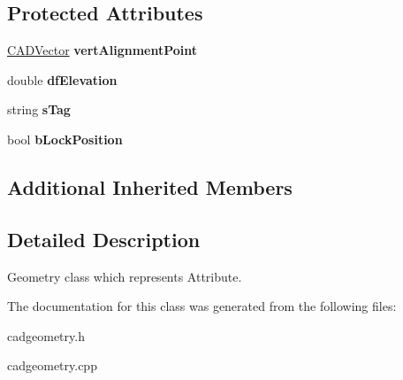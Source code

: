 \subsection*{Protected Attributes}
\begin{DoxyCompactItemize}
\item 
\hyperlink{class_c_a_d_vector}{C\+A\+D\+Vector} {\bfseries vert\+Alignment\+Point}\hypertarget{class_c_a_d_attrib_aead893b2d8dcb83afd25b379a2d18185}{}\label{class_c_a_d_attrib_aead893b2d8dcb83afd25b379a2d18185}

\item 
double {\bfseries df\+Elevation}\hypertarget{class_c_a_d_attrib_a7aec72015ed67dec7bd81e9400af1a32}{}\label{class_c_a_d_attrib_a7aec72015ed67dec7bd81e9400af1a32}

\item 
string {\bfseries s\+Tag}\hypertarget{class_c_a_d_attrib_a739fe51000f950dac526f397eaa995aa}{}\label{class_c_a_d_attrib_a739fe51000f950dac526f397eaa995aa}

\item 
bool {\bfseries b\+Lock\+Position}\hypertarget{class_c_a_d_attrib_ac57f77ae05f7651e4c9266796d4e335a}{}\label{class_c_a_d_attrib_ac57f77ae05f7651e4c9266796d4e335a}

\end{DoxyCompactItemize}
\subsection*{Additional Inherited Members}


\subsection{Detailed Description}
Geometry class which represents Attribute. 

The documentation for this class was generated from the following files\+:\begin{DoxyCompactItemize}
\item 
cadgeometry.\+h\item 
cadgeometry.\+cpp\end{DoxyCompactItemize}
